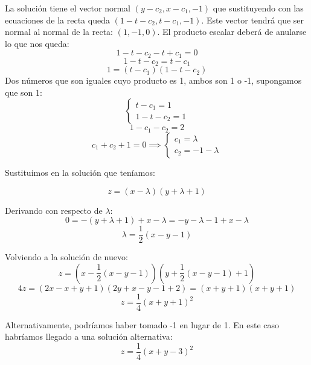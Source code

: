 \documentclass[openany]{book}
\begin{document}
\begin{exercise}
      La solución tiene el vector normal $ (y-c_2,x-c_1,-1) $ que sustituyendo con las ecuaciones de la recta queda $ (1-t-c_2,t-c_1,-1) $. Este vector tendrá que ser normal al normal de la recta: $ (1,-1,0) $. El producto escalar deberá de anularse lo que nos queda:
      $$ 1-t-c_2-t+c_1 = 0  $$
      $$ 1-t-c_2=t-c_1 $$
      $$ 1 = (t-c_1)(1-t-c_2) $$
      Dos números que son iguales cuyo producto es 1, ambos son 1 o -1, supongamos que son 1:
      $$ \left\{
      \begin{array}{l}
        t-c_1 = 1\\ 
        1-t-c_2 = 1
      \end{array}
      \right. $$
      $$  1-c_1-c_2 = 2 $$
      $$ c_1+c_2+1 = 0 \implies \left\{
      \begin{array}{l}
        c_1 = \lambda\\ 
        c_2 = -1-\lambda 
      \end{array}
      \right.$$

      Sustituimos en la solución que teníamos:
      
      $$ z = (x-\lambda)(y+\lambda +1) $$

      Derivando con respecto de $ \lambda $:
      $$  0 = -(y+\lambda +1 )+ x -\lambda = -y-\lambda-1+x-\lambda $$
      $$  \lambda = \dfrac{1}{2}(x-y-1) $$

      Volviendo a la solución de nuevo:
      $$ z = (x-\dfrac{1}{2}(x-y-1))(y+\dfrac{1}{2}(x-y-1)+1) $$
      $$ 4z = (2x-x+y+1)(2y+x-y-1+2)=(x+y+1)(x+y+1) $$
      $$ z = \dfrac{1}{4}(x+y+1)^2 $$

      Alternativamente, podríamos haber tomado -1 en lugar de 1. En este caso habríamos llegado a una solución alternativa:
      $$ z = \dfrac{1}{4}(x+y-3)^2 $$



\end{exercise}
\end{document}
